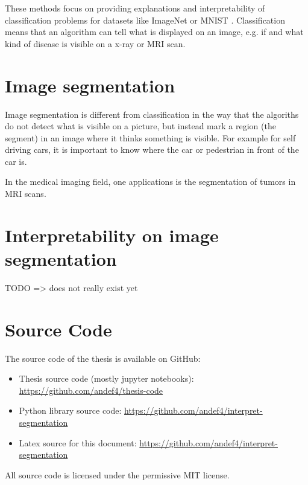 These methods focus on providing explanations and interpretability of classification problems for datasets like ImageNet \cite{imagenet_cvpr09} or MNIST \cite{lecun-mnisthandwrittendigit-2010}. Classification means that an algorithm can tell what is displayed on an image, e.g. if and what kind of disease is visible on a x-ray or MRI scan.

\section{Image segmentation}
Image segmentation is different from classification in the way that the algoriths do not detect what is visible on a picture, but instead mark a region (the segment) in an image where it thinks something is visible. For example for self driving cars, it is important to know where the car or pedestrian in front of the car is. 

In the medical imaging field, one applications is the segmentation of tumors in MRI scans.

\section{Interpretability on image segmentation}
TODO => does not really exist yet

\section{Source Code}
The source code of the thesis is available on GitHub:
\begin{itemize}
    \item Thesis source code (mostly jupyter notebooks): \url{https://github.com/andef4/thesis-code}
    \item Python library source code: \url{https://github.com/andef4/interpret-segmentation}
    \item Latex source for this document: \url{https://github.com/andef4/interpret-segmentation}
\end{itemize}

All source code is licensed under the permissive MIT license.